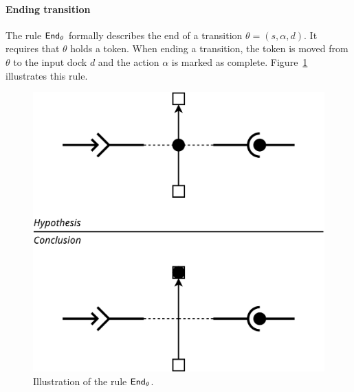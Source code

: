 \paragraph{Ending transition}{

The rule $\mathsf{End}_\theta$ formally describes the end of a transition
$\theta = (s, \alpha, d)$. It requires that $\theta$ holds a
token. When ending a transition, the token is moved from $\theta$ to
the input dock $d$ and the action $\alpha$ is marked as
complete. Figure~\ref{fig:r2} illustrates this rule.

\begin{figure}[t]
\begin{center}
  \includegraphics[width=0.55\columnwidth]{./images/ending_transition.pdf}
\end{center}
\caption{Illustration of the rule $\mathsf{End}_\theta$.}
\label{fig:r2}
\end{figure}
  
}

